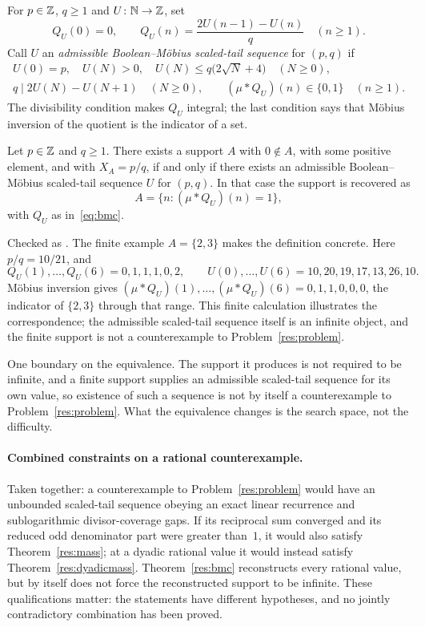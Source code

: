 \documentclass[11pt]{article}
\begin{document}
For $p\in\mathbb{Z}$, $q\ge1$ and $U\colon\mathbb{N}\to\mathbb{Z}$, set
\[
  Q_U(0)=0,\qquad
  Q_U(n)=\frac{2U(n-1)-U(n)}q\quad(n\ge1).
\]
Call $U$ an \emph{admissible Boolean--M\"obius scaled-tail sequence} for
$(p,q)$ if
\[
\begin{gathered}
 U(0)=p,\quad U(N)>0,\quad
 U(N)\le q\bigl(2\sqrt N+4\bigr)\quad(N\ge0),\\
 q\mid 2U(N)-U(N+1)\quad(N\ge0),\qquad
 (\mu*Q_U)(n)\in\{0,1\}\quad(n\ge1).
\end{gathered}
\tag{2}\label{eq:bmc}
\]
The divisibility condition makes $Q_U$ integral; the last condition says that
M\"obius inversion of the quotient is the indicator of a set.

\begin{theorem}\label{res:bmc}
Let $p\in\mathbb{Z}$ and $q\ge1$.  There exists a support $A$ with $0\notin A$, with
some positive element, and with $X_A=p/q$, if and only if there exists an
admissible Boolean--M\"obius scaled-tail sequence $U$ for $(p,q)$.  In that
case the support is recovered as
\[
  A=\{n:(\mu*Q_U)(n)=1\},
\]
with $Q_U$ as in~\eqref{eq:bmc}.
\end{theorem}

\noindent Checked as
.
The finite example $A=\{2,3\}$ makes the definition concrete.  Here
$p/q=10/21$, and
\[
 Q_U(1),\ldots,Q_U(6)=0,1,1,1,0,2,\qquad
 U(0),\ldots,U(6)=10,20,19,17,13,26,10.
\]
M\"obius inversion gives
$(\mu*Q_U)(1),\ldots,(\mu*Q_U)(6)=0,1,1,0,0,0$, the indicator of
$\{2,3\}$ through that range.  This finite calculation illustrates the
correspondence; the admissible scaled-tail sequence itself is an infinite
object, and the finite support is not a counterexample to
Problem~\ref{res:problem}.

One boundary on the equivalence.  The support it produces is not required to be
infinite, and a finite support supplies an admissible scaled-tail sequence for
its own value, so existence of such a sequence is not by itself a
counterexample to Problem~\ref{res:problem}.
What the equivalence changes is the search space, not the difficulty.

\paragraph{Combined constraints on a rational counterexample.}
Taken together: a counterexample to Problem~\ref{res:problem} would have an
unbounded scaled-tail sequence obeying an exact linear recurrence and
sublogarithmic divisor-coverage gaps.  If its reciprocal sum converged and its
reduced odd denominator part were greater than~$1$, it would also satisfy
Theorem~\ref{res:mass}; at a dyadic rational value it would instead satisfy
Theorem~\ref{res:dyadicmass}.  Theorem~\ref{res:bmc} reconstructs every
rational value, but by itself does not force the reconstructed support to be
infinite.  These qualifications matter: the statements have different
hypotheses, and no jointly contradictory combination has been proved.
\end{document}

